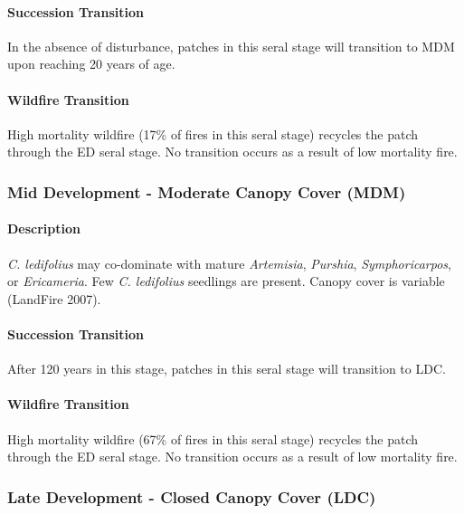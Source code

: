 \paragraph*{Succession Transition} In the absence of disturbance, patches in this seral stage will transition to MDM upon reaching 20 years of age. 

\paragraph*{Wildfire Transition} High mortality wildfire (17\% of fires in this seral stage) recycles the patch through the ED seral stage. No transition occurs as a result of low mortality fire.

\noindent\hrulefill


\subsubsection*{Mid Development - Moderate Canopy Cover (MDM)}

\paragraph*{Description} \emph{C. ledifolius} may co-dominate with mature \emph{Artemisia}, \emph{Purshia}, \emph{Symphoricarpos}, or \emph{Ericameria}. Few \emph{C. ledifolius} seedlings are present. Canopy cover is variable (LandFire 2007).

\paragraph*{Succession Transition} After 120 years in this stage, patches in this seral stage will transition to LDC.

\paragraph*{Wildfire Transition} High mortality wildfire (67\% of fires in this seral stage) recycles the patch through the ED seral stage. No transition occurs as a result of low mortality fire.

\noindent\hrulefill


\subsubsection*{Late Development - Closed Canopy Cover (LDC)}

